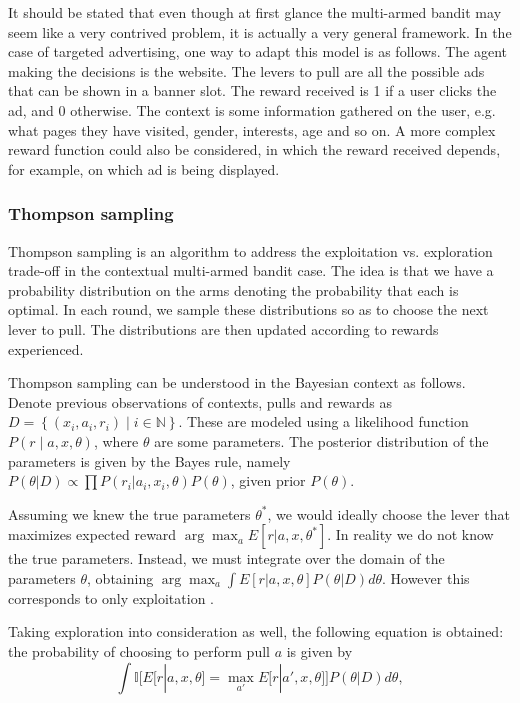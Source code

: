 \documentclass{article} %
\newcommand{\setof}[1]{\ensuremath{\left \{ #1 \right \}}}
\begin{document}
It should be stated that even though at first glance the multi-armed bandit
may seem like a very contrived problem, it is actually a very general
framework. In the case of targeted advertising, one way to adapt this model
is as follows.  The agent making the decisions is the website. The levers to
pull are all the possible ads that can be shown in a banner slot. The reward
received is 1 if a user clicks the ad, and 0 otherwise. The context is some
information gathered on the user, e.g. what pages they have visited, gender,
interests, age and so on. A more complex reward function could also be
considered, in which the reward received depends, for example, on which ad is
being displayed.

\subsubsection{Thompson sampling}
Thompson sampling \cite{chapelle2011empirical} is an algorithm to address the
exploitation vs. exploration trade-off in the contextual multi-armed bandit
case. The idea is that we have a probability distribution on the arms denoting
the probability that each is optimal. In each round, we sample these
distributions so as to choose the next lever to pull. The distributions are
then updated according to rewards experienced.

Thompson sampling can be understood in the Bayesian context as follows. Denote
previous observations of contexts, pulls and rewards as $D = \setof{(x_i, a_i,
r_i) \;|\; i \in \mathbb{N}}$. These are modeled using a likelihood function
$P(r \;|\; a,x,\theta)$, where $\theta$ are some parameters. The posterior
distribution of the parameters is given by the Bayes rule, namely $P(\theta |
D) \propto \prod P(r_i | a_i, x_i, \theta) P(\theta)$, given prior $P(\theta)$.

Assuming we knew the true parameters $\theta^*$, we would ideally choose the
lever that maximizes expected reward $\arg\max_a E[r | a, x, \theta^*]$. In
reality we do not know the true parameters. Instead, we must integrate over the
domain of the parameters $\theta$, obtaining $\arg\max_a \int E[r | a, x,
\theta] P(\theta|D) d\theta$. However this corresponds to only exploitation
\cite{chapelle2011empirical}.

Taking exploration into consideration as well, the following equation is
obtained: the probability of choosing to perform pull $a$ is given by
\begin{equation}
  \int \mathbb{I}\bigg[E[r|a,x,\theta] = \max_{a'}
  E\big[r|a',x,\theta\big]\bigg] P(\theta | D) d\theta,
\end{equation}
\end{document}
